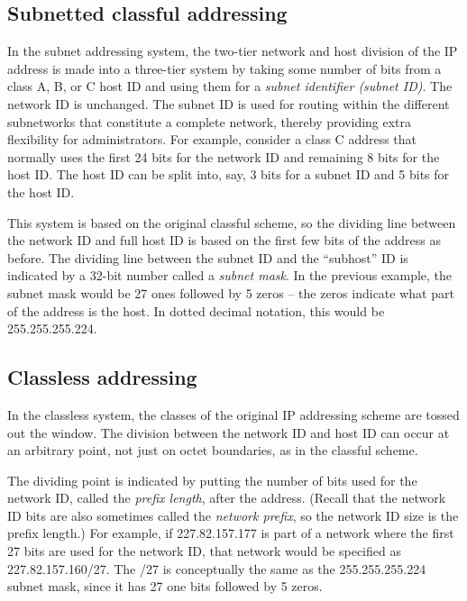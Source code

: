 \subsection{Subnetted classful addressing}

In the subnet addressing system, the two-tier network and host division
of the IP address is made into a three-tier system by taking some number
of bits from a class A, B, or C host ID and using them for a
{\emph{subnet identifier (subnet ID)}}. The network ID is unchanged. The
subnet ID is used for routing within the different subnetworks that
constitute a complete network, thereby providing extra flexibility for
administrators. For example, consider a class C address that normally
uses the first 24 bits for the network ID and remaining 8 bits for the
host ID. The host ID can be split into, say, 3 bits for a subnet ID and
5 bits for the host ID.

This system is based on the original classful scheme, so the dividing
line between the network ID and full host ID is based on the first few
bits of the address as before. The dividing line between the subnet ID
and the ``subhost'' ID is indicated by a 32-bit number called a
{\emph{subnet mask}}. In the previous example, the subnet mask would be
27 ones followed by 5 zeros -- the zeros indicate what part of the
address is the host. In dotted decimal notation, this would be
255.255.255.224.




\subsection{Classless addressing}

In the classless system, the classes of the original IP addressing
scheme are tossed out the window. The division between the network ID
and host ID can occur at an arbitrary point, not just on octet
boundaries, as in the classful scheme.

The dividing point is indicated by putting the number of bits used for
the network ID, called the {\emph{prefix length}}, after the address.
(Recall that the network ID bits are also sometimes called the
{\emph{network prefix}}, so the network ID size is the prefix length.)
For example, if 227.82.157.177 is part of a network where the first 27
bits are used for the network ID, that network would be specified as
227.82.157.160/27. The /27 is conceptually the same as the
255.255.255.224 subnet mask, since it has 27 one bits followed by 5
zeros.


